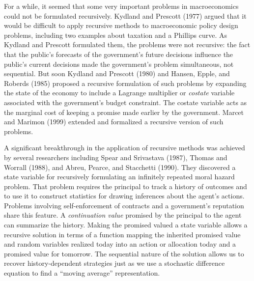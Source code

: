     
 
For a while, it seemed that some very important problems in
macroeconomics could not be  formulated  recursively. Kydland and
Prescott (1977) argued that it would be difficult to apply
recursive methods to  macroeconomic policy design problems,
including two examples about taxation and a Phillips curve.
%
  As Kydland and Prescott
formulated them,  the problems were not recursive:  the fact that
the public's  forecasts of the government's future decisions
influence the public's current decisions made the government's
problem  simultaneous, not sequential.
But soon Kydland and Prescott (1980) and Hansen, Epple,
and Roberds (1985) proposed
a recursive formulation of such problems by expanding
the state of the economy to include a Lagrange multiplier
or {\it costate} variable associated with the government's
budget  constraint. The costate variable acts as
the marginal cost
 of keeping a   promise made earlier by the government.
Marcet and Marimon (1999) extended and formalized
a recursive version of such problems. %

 A significant breakthrough in the application of
    recursive methods
was achieved by several researchers including Spear and Srivastava
(1987), Thomas and Worrall (1988), and Abreu, Pearce, and
Stacchetti (1990).
%
%
%
 They discovered
a state variable for recursively formulating an
 infinitely repeated moral hazard problem. That  problem
requires the
principal  to  track  a history
of outcomes  and to use it  to construct statistics for drawing
inferences about the agent's actions.
Problems involving self-enforcement of contracts and a
government's
reputation share this feature.
A {\it continuation value}
promised by the principal to the agent can
 summarize the history.
Making the promised valued  a state variable allows
a recursive  solution in terms of a function
mapping the inherited promised value and random
variables  realized today into an action or
 allocation today and a promised value for
tomorrow.  The sequential nature of the solution allows us to
recover history-dependent strategies just as we use a stochastic
difference equation to find a ``moving average''
representation.    
 
 

